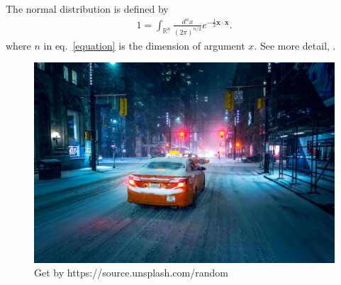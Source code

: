 \documentclass[final]{article}
\begin{document}
The normal distribution is defined by
\begin{align}
  1 = \int_{\mathbb{R}^n} \frac{d^nx}{(2 \pi)^{n/2}} e^{-\frac{1}{2} \bm{x} \cdot \bm{x}}.
  \label{equation}
\end{align}
where $n$ in eq.~\eqref{equation} is the dimension of argument $x$.
See more detail, \cite{Lang:alg}.




\begin{figure}
  \centering
  \includegraphics[width=0.7\linewidth]{src/images/sample.png}
  \caption{Get by https://source.unsplash.com/random}
  \label{Fig}
\end{figure}

\end{document}
